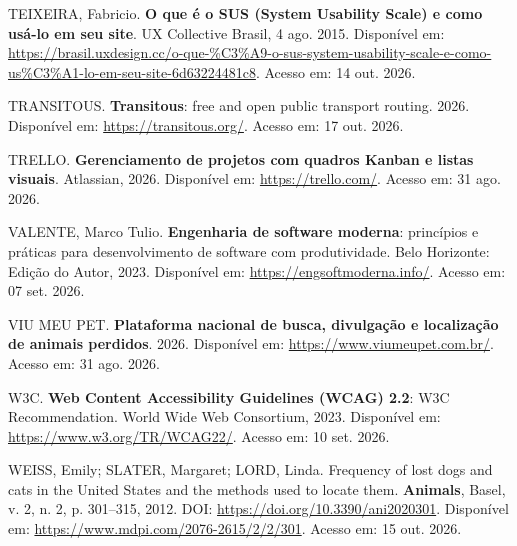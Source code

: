 \begin{flushleft}
\vspace{12pt}
\noindent TEIXEIRA, Fabricio. \textbf{O que é o SUS (System Usability Scale) e como usá-lo em seu site}. UX Collective Brasil, 4 ago. 2015. Disponível em: \url{https://brasil.uxdesign.cc/o-que-%C3%A9-o-sus-system-usability-scale-e-como-us%C3%A1-lo-em-seu-site-6d63224481c8}. Acesso em: 14 out. 2026.

\vspace{12pt}
\noindent TRANSITOUS. \textbf{Transitous}: free and open public transport routing. 2026. Disponível em: \url{https://transitous.org/}. Acesso em: 17 out. 2026.

\vspace{12pt}
\noindent TRELLO. \textbf{Gerenciamento de projetos com quadros Kanban e listas visuais}. Atlassian, 2026. Disponível em: \url{https://trello.com/}. Acesso em: 31 ago. 2026.

\vspace{12pt}
\noindent VALENTE, Marco Tulio. \textbf{Engenharia de software moderna}: princípios e práticas para desenvolvimento de software com produtividade. Belo Horizonte: Edição do Autor, 2023. Disponível em: \url{https://engsoftmoderna.info/}. Acesso em: 07 set. 2026.

\vspace{12pt}
\noindent VIU MEU PET. \textbf{Plataforma nacional de busca, divulgação e localização de animais perdidos}. 2026. Disponível em: \url{https://www.viumeupet.com.br/}. Acesso em: 31 ago. 2026.

\vspace{12pt}
\noindent W3C. \textbf{Web Content Accessibility Guidelines (WCAG) 2.2}: W3C Recommendation. World Wide Web Consortium, 2023. Disponível em: \url{https://www.w3.org/TR/WCAG22/}. Acesso em: 10 set. 2026.

\vspace{12pt}
\noindent WEISS, Emily; SLATER, Margaret; LORD, Linda. Frequency of lost dogs and cats in the United States and the methods used to locate them. \textbf{Animals}, Basel, v. 2, n. 2, p. 301--315, 2012. DOI: \url{https://doi.org/10.3390/ani2020301}. Disponível em: \url{https://www.mdpi.com/2076-2615/2/2/301}. Acesso em: 15 out. 2026.

\end{flushleft}
\clearpage
